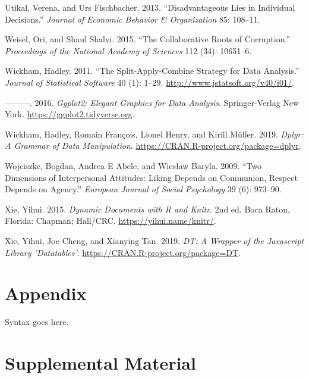 \documentclass[man]{apa6}
\begin{document}
\leavevmode\hypertarget{ref-utikal2013disadvantageous}{}%
Utikal, Verena, and Urs Fischbacher. 2013. ``Disadvantageous Lies in
Individual Decisions.'' \emph{Journal of Economic Behavior \&
Organization} 85: 108--11.

\leavevmode\hypertarget{ref-weisel2015collaborative}{}%
Weisel, Ori, and Shaul Shalvi. 2015. ``The Collaborative Roots of
Corruption.'' \emph{Proceedings of the National Academy of Sciences} 112
(34): 10651--6.

\leavevmode\hypertarget{ref-R-plyr}{}%
Wickham, Hadley. 2011. ``The Split-Apply-Combine Strategy for Data
Analysis.'' \emph{Journal of Statistical Software} 40 (1): 1--29.
\url{http://www.jstatsoft.org/v40/i01/}.

\leavevmode\hypertarget{ref-R-ggplot2}{}%
---------. 2016. \emph{Ggplot2: Elegant Graphics for Data Analysis}.
Springer-Verlag New York. \url{https://ggplot2.tidyverse.org}.

\leavevmode\hypertarget{ref-R-dplyr}{}%
Wickham, Hadley, Romain François, Lionel Henry, and Kirill Müller. 2019.
\emph{Dplyr: A Grammar of Data Manipulation}.
\url{https://CRAN.R-project.org/package=dplyr}.

\leavevmode\hypertarget{ref-wojciszke2009two}{}%
Wojciszke, Bogdan, Andrea E Abele, and Wiesław Baryla. 2009. ``Two
Dimensions of Interpersonal Attitudes: Liking Depends on Communion,
Respect Depends on Agency.'' \emph{European Journal of Social
Psychology} 39 (6): 973--90.

\leavevmode\hypertarget{ref-R-knitr}{}%
Xie, Yihui. 2015. \emph{Dynamic Documents with R and Knitr}. 2nd ed.
Boca Raton, Florida: Chapman; Hall/CRC. \url{https://yihui.name/knitr/}.

\leavevmode\hypertarget{ref-R-DT}{}%
Xie, Yihui, Joe Cheng, and Xianying Tan. 2019. \emph{DT: A Wrapper of
the Javascript Library 'Datatables'}.
\url{https://CRAN.R-project.org/package=DT}.

\endgroup

\newpage

\hypertarget{appendix}{%
\section{Appendix}\label{appendix}}

Syntax goes here.

\newpage

\hypertarget{supplemental-material}{%
\section{Supplemental Material}\label{supplemental-material}}
\end{document}
